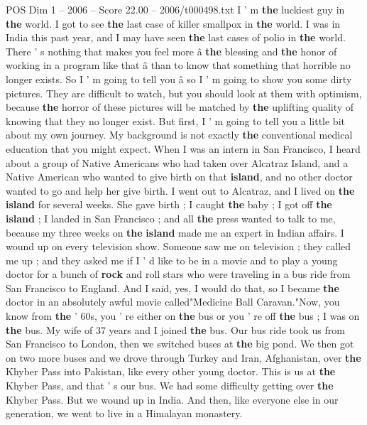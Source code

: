 \begin{textsample}{POS Dim 1 – 2006 – Score 22.00 – 2006/t000498.txt}  \label{ex:f1_pos_011}
I ' m \textbf{the} luckiest guy in \textbf{the} world.
I got to see \textbf{the} last case of killer smallpox in \textbf{the} world.
I was in India this past year, and I may have seen \textbf{the} last cases of polio in \textbf{the} world.
There ' s nothing that makes you feel more â \textbf{the} blessing and \textbf{the} honor of working in a program like that â than to know that something that horrible no longer exists.
So I ' m going to tell you â so I ' m going to show you some dirty pictures.
They are difficult to watch, but you should look at them with optimism, because \textbf{the} horror of these pictures will be matched by \textbf{the} uplifting quality of knowing that they no longer exist.
But first, I ' m going to tell you a little bit about my own journey.
My background is not exactly \textbf{the} conventional medical education that you might expect.
When I was an intern in San Francisco, I heard about a group of Native Americans who had taken over Alcatraz Island, and a Native American who wanted to give birth on that \textbf{island}, and no other doctor wanted to go and help her give birth.
I went out to Alcatraz, and I lived on \textbf{the} \textbf{island} for several weeks.
She gave birth ; I caught \textbf{the} baby ; I got off \textbf{the} \textbf{island} ; I landed in San Francisco ; and all \textbf{the} press wanted to talk to me, because my three weeks on \textbf{the} \textbf{island} made me an expert in Indian affairs.
I wound up on every television show.
Someone saw me on television ; they called me up ; and they asked me if I ' d like to be in a movie and to play a young doctor for a bunch of \textbf{rock} and roll stars who were traveling in a bus ride from San Francisco to England.
And I said, yes, I would do that, so I became \textbf{the} doctor in an absolutely awful movie called"Medicine Ball Caravan."Now, you know from \textbf{the} ' 60s, you ' re either on \textbf{the} bus or you ' re off \textbf{the} bus ; I was on \textbf{the} bus.
My wife of 37 years and I joined \textbf{the} bus.
Our bus ride took us from San Francisco to London, then we switched buses at \textbf{the} big pond.
We then got on two more buses and we drove through Turkey and Iran, Afghanistan, over \textbf{the} Khyber Pass into Pakistan, like every other young doctor.
This is us at \textbf{the} Khyber Pass, and that ' s our bus.
We had some difficulty getting over \textbf{the} Khyber Pass.
But we wound up in India.
And then, like everyone else in our generation, we went to live in a Himalayan monastery.

\end{textsample}
